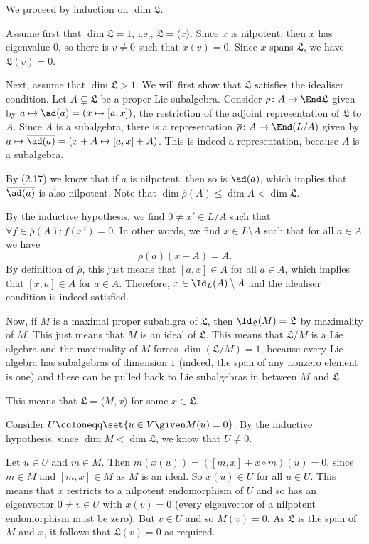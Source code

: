 We proceed by induction on $\dim \mathfrak{L}$.

Assume first that $\dim \mathfrak{L} = 1$, i.e., $\mathfrak{L} = \langle x\rangle$.
Since $x$ is nilpotent, then $x$ has eigenvalue $0$, so there is $v\neq 0$ such that
$x(v) = 0$. Since $x$ spans $\mathfrak{L}$, we have $\mathfrak{L}(v) = 0$.

Next, assume that $\dim \mathfrak{L} > 1$. We will first show that $\mathfrak{L}$
satisfies the idealiser condition. Let $A \subsetneq \mathfrak{L}$ be a proper
Lie subalgebra. Consider $\rho\colon A\to \End \mathfrak{L}$ given by
$a\mapsto \ad(a) = (x \mapsto [a, x])$, the restriction of the adjoint representation
of $\mathfrak{L}$ to $A$. Since $A$ is a subalgebra, there is a representation
$\overline{\rho}\colon A\to \End(L/A)$ given by $a\mapsto \overline{\ad(a)} = (x + A\mapsto [a, x] + A)$.
This is indeed a representation, because $A$ is a subalgebra.

By (2.17) we know that if $a$ is nilpotent, then so is $\ad(a)$, which implies that
$\overline{\ad(a)}$ is also nilpotent. Note that $\dim \overline{\rho}(A)\leq\dim A<\dim \mathfrak{L}$.

By the inductive hypothesis, we find $0 \neq x' \in L/A$ such that
$\forall f \in \overline{\rho}(A)\colon f(x') = 0$. In other words, we find
$x \in L\setminus A$ such that for all $a \in A$ we have
\[ \overline{\rho}(a)(x + A) = A. \]
By definition of $\overline{\rho}$, this just means that $[a, x] \in A$
for all $a \in A$, which implies that $[x, a] \in A$ for $a \in A$.
Therefore, $x \in \Id_L(A) \setminus A$ and the idealiser condition is indeed
satisfied.

Now, if $M$ is a maximal proper subablgra of $\mathfrak{L}$, then
$\Id_{\mathfrak{L}}(M) = \mathfrak{L}$ by maximality of $M$. This just means
that $M$ is an ideal of $\mathfrak{L}$. This means that $\mathfrak{L}/M$ is a Lie
algebra and the maximality of $M$ forces $\dim(\mathfrak{L}/M) = 1$, because every
Lie algebra has subalgebras of dimension $1$ (indeed, the span of any nonzero element
is one) and these can be pulled back to Lie subalgebras in between $M$ and $\mathfrak{L}$.

This means that $\mathfrak{L} = \langle M, x\rangle$ for some $x \in \mathfrak{L}$.

Consider $U\coloneqq \set{u \in V\given M(u) = 0}$. By the inductive hypothesis,
since $\dim M < \dim \mathfrak{L}$, we know that $U\neq 0$.

Let $u \in U$ and $m \in M$. Then $m(x(u)) = ([m, x] + x \circ m)(u) = 0$, since
$m \in M$ and $[m, x] \in M$ as $M$ is an ideal.
So $x(u) \in U$ for all $u \in U$. This means that $x$ restricts to a nilpotent endomorphism
of $U$ and so has an eigenvector $0\neq v \in U$ with $x(v) = 0$ (every eigenvector
of a nilpotent endomorphism must be zero). But $v \in U$ and so $M(v) = 0$.
As $\mathfrak{L}$ is the span of $M$ and $x$, it follows that $\mathfrak{L}(v) = 0$
as required.
